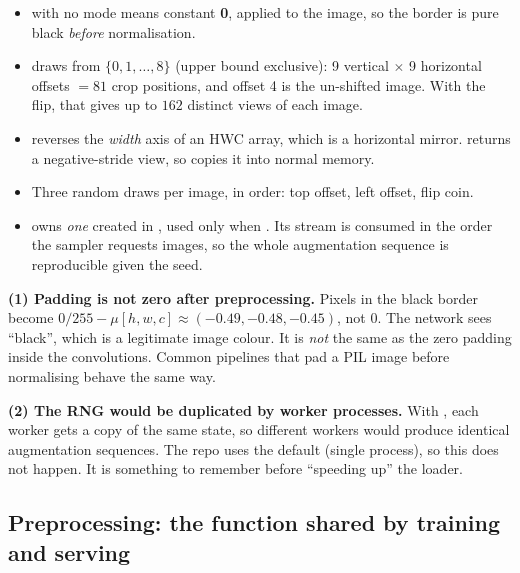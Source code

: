 \begin{repo}
\begin{itemize}[nosep]
  \item {} with no mode means constant \textbf{0}, applied to the  image, so the border is pure black \emph{before} normalisation.
  \item {} draws from $\{0,1,\dots,8\}$ (upper bound exclusive): 9 vertical $\times$ 9 horizontal offsets $=81$ crop positions, and offset 4 is the un-shifted image. With the flip, that gives up to $162$ distinct views of each image.
  \item {} reverses the \emph{width} axis of an HWC array, which is a horizontal mirror.  returns a negative-stride view, so  copies it into normal memory.
  \item Three random draws per image, in order: top offset, left offset, flip coin.
  \item {} owns \emph{one}  created in , used only when . Its stream is consumed in the order the sampler requests images, so the whole augmentation sequence is reproducible given the seed.
\end{itemize}
\end{repo}

\begin{warn}
\textbf{(1) Padding is not zero after preprocessing.} Pixels in the black border become $0/255-\mu[h,w,c]\approx(-0.49,-0.48,-0.45)$, not 0. The network sees ``black'', which is a legitimate image colour. It is \emph{not} the same as the zero padding inside the convolutions. Common pipelines that pad a PIL image before normalising behave the same way.

\textbf{(2) The RNG would be duplicated by worker processes.} With , each worker gets a copy of the same  state, so different workers would produce identical augmentation sequences. The repo uses the default  (single process), so this does not happen. It is something to remember before ``speeding up'' the loader.
\end{warn}

\subsection{Preprocessing: the function shared by training and serving}
\label{sec:preprocess}

